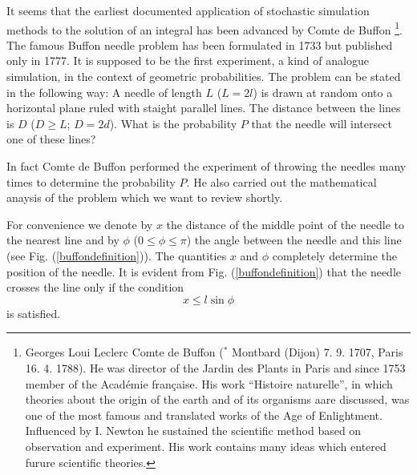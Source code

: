 It seems that the earliest documented application of stochastic simulation
methods to the solution of an integral has been advanced by Comte de
Buffon \footnote{Georges Loui Leclerc Comte de Buffon ($^*$ Montbard
  (Dijon) 7. 9. 1707, \dag Paris 16. 4. 1788). He was director of the
  Jardin des Plants in Paris and since 1753 member of the Acad\'emie 
fran\c{c}aise. His  work ``Histoire naturelle'', in which theories
about the origin of the earth and of  its organisms aare discussed,
was one of the most famous and translated works of the Age of
Enlightment. Influenced by I. Newton he sustained the scientific
method based on observation and experiment. His work contains many
ideas which entered furure scientific theories.}. The famous Buffon
needle problem has been formulated in 1733 but published only in 1777. It is
supposed
to be the first experiment, a kind of analogue simulation, in the
context of geometric probabilities. The problem can be stated in the
following way: A needle of length $L$ ($L=2l$) is drawn at random onto a
horizontal plane ruled with staight parallel lines. The distance
between the lines is $D$ ($D \ge L$; $D=2d$). 
What is the probability $P$ that the
needle will intersect one of these lines?

In fact Comte de Buffon performed the experiment of throwing the
needles many times to determine the probability $P$. He also carried
out the mathematical anaysis of the problem which we want to review
shortly.

For convenience we denote by $x$ the distance of the middle point of
the needle to the nearest line and by $\phi$ ($0 \le \phi \le \pi$) the
angle between the needle and this line (see
Fig. (\ref{buffondefinition})). The quantities $x$ and $\phi$
completely determine the position of the needle. It is evident from
Fig. (\ref{buffondefinition}) that the needle crosses the line only if
the condition
\begin{equation}
\label{buffoncondition}
x \le l \sin \phi
\end{equation}
is satisfied.


